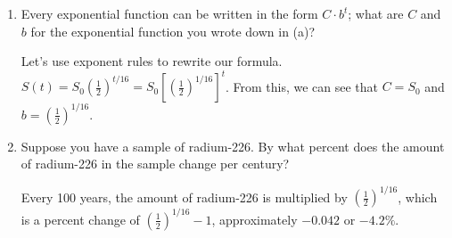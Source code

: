 \documentclass{article}
\begin{document}
\begin{enumerate}
\begin{enumerate}
    \begin{problem}[\vfill]
      Sketch a graph of the amount of radium-226 in the sample as a function of time.
    \end{problem}

    \begin{solution}
      We know that the $y$-intercept is at $(0, S_0)$, and we also know that
      the graph passes through the point $(16, \frac{1}{2}S_0)$. The amount of radium-226
      decays exponentially, so there is a horizontal asymptote at $y=0$.
    
    \end{solution}

  \item

    \begin{problem}[\stretch{0.35}]
      Every exponential function can be written in the form $C \cdot b^t$; what are $C$ and $b$ for the exponential function you wrote down in (a)?
    \end{problem}

    \begin{solution}
      Let's use exponent rules to rewrite our formula.
      $S(t) = S_0\left(\frac{1}{2}\right)^{t/16} = 
      S_0 \left[\left(\frac{1}{2}\right)^{1/16}\right]^t$.
      From this, we can see that $C=S_0$ and $b = \left(\frac{1}{2}\right)^{1/16}$.
    \end{solution}

  \item
    \begin{problem}[\nstretch{0.35}]
      Suppose you have a sample of radium-226. By what percent does the amount of radium-226 in the sample change per century?
    \end{problem}

    \begin{solution}
      Every 100 years, the amount of radium-226 is multiplied by 
      $\left(\frac{1}{2}\right)^{1/16}$, which is a percent change
       of $\left(\frac{1}{2}\right)^{1/16}-1$, approximately $-0.042$ or $-4.2\%$.
    \end{solution}


\end{enumerate}
\end{enumerate}
\end{document}
